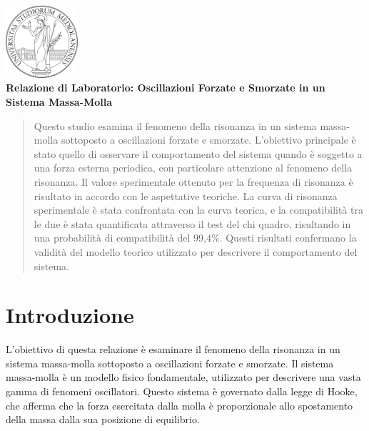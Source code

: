 \documentclass[12pt]{article}
\begin{document}
\thispagestyle{firstpage} %

\begin{center}
    \includegraphics[width=0.20\textwidth]{logo.png} \\[1cm] %
    \Large\textbf{Relazione di Laboratorio: Oscillazioni Forzate e Smorzate in un Sistema Massa-Molla} \\ %
\end{center}

\vspace*{1cm} %

\begin{abstract}
Questo studio esamina il fenomeno della risonanza in un sistema massa-molla sottoposto a oscillazioni forzate e smorzate. L'obiettivo principale è stato quello di osservare il comportamento del sistema quando è soggetto a una forza esterna periodica, con particolare attenzione al fenomeno della risonanza. Il valore sperimentale ottenuto per la frequenza di risonanza è risultato in accordo con le aspettative teoriche. La curva di risonanza sperimentale è stata confrontata con la curva teorica, e la compatibilità tra le due è stata quantificata attraverso il test del chi quadro, risultando in una probabilità di compatibilità del 99,4\%. Questi risultati confermano la validità del modello teorico utilizzato per descrivere il comportamento del sistema.
\end{abstract}


\section{Introduzione}

L'obiettivo di questa relazione è esaminare il fenomeno della risonanza in un sistema massa-molla sottoposto a oscillazioni forzate e smorzate. Il sistema massa-molla è un modello fisico fondamentale, utilizzato per descrivere una vasta gamma di fenomeni oscillatori. Questo sistema è governato dalla legge di Hooke, che afferma che la forza esercitata dalla molla è proporzionale allo spostamento della massa dalla sua posizione di equilibrio.
\end{document}
